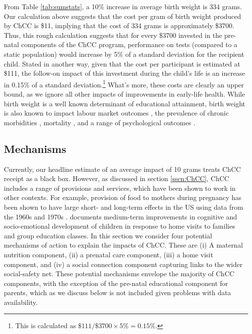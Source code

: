 \documentclass[12pt]{article}
\begin{document}
\begin{spacing}{1.4}
From Table \ref{tab:sumstats}, a 10\% increase in average birth weight is
334 grams.  Our calculation above suggests that the cost per gram of birth
weight produced by ChCC is \$11, implying that the cost of 334 grams is
approximately \$3700.  Thus, this rough calculation suggests that for every
\$3700 invested in the pre-natal components of the ChCC program, performance
on tests (compared to a static population) would increase by 5\% of a
standard deviation for the recipient child.  Stated in another way, given
that the cost per participant is estimated at \$111, the follow-on impact of
this investment during the child's life is an increase in 0.15\% of a standard
deviation.\footnote{This is calculated as $\$111/\$3700\times5\%=0.15\%$.}
What's more, these costs are clearly an upper bound,
as we ignore all other impacts of improvements in early-life health.  While
birth weight is a well known determinant of educational attainment, birth
weight is also known to impact labour market outcomes
\citep{JohnsonSchoeni2011,CookFletcher2015,BehrmanRosenzweig2004,
  RosenzweigZhang2013,Caseetal2005}, the prevalence of chronic morbidities
\citep{Barker1995,AlmondMazumder2005,JohnsonSchoeni2011b}, mortality
\citep{vandenBergetal2006}, and a range of psychological outcomes
\citep{Fletcher2011}.

\subsection{Mechanisms}
\label{scn:Mechanisms}
Currently, our headline estimate of an average impact of 10 grams treats
ChCC receipt as a black box.  However, as discussed in section
\ref{sscn:ChCC}, ChCC includes a range of provisions and services, which
have been shown to work in other contexts.  For example, provision of food
to mothers during pregnancy has been shown to have large short- and
long-term effects in the US using data from the 1960s and 1970s
\citep{Almondetal2011,Hoynesetal2016}. \citet{Doyle2017} documents
medium-term improvements in cognitive and socio-emotional development
of children in response to home visits to families and group education
classes.  In this section we consider four potential mechanisms of action
to explain the impacts of ChCC.  These are (i) A maternal nutrition component,
(ii) a prenatal care component, (iii) a home visit component, and (iv) a social
connection component capturing links to the wider social-safety net.  These
potential mechanisms envelope the majority of ChCC components, with the
exception of the pre-natal educational component for parents, which as
we discuss below is not included given problems with data availability.


\end{spacing}
\end{document}
